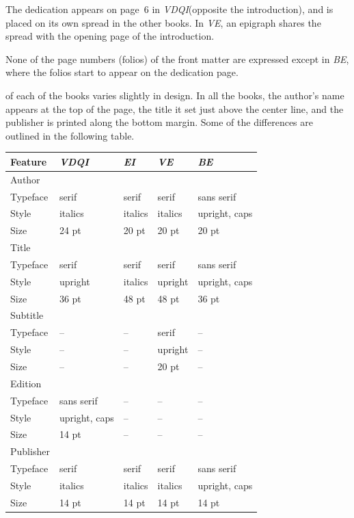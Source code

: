 \documentclass[nohyper,nobib]{thiel-book}
\newcommand{\vdqi}{\textit{VDQI}\xspace}
\newcommand{\ei}{\textit{EI}\xspace}
\newcommand{\ve}{\textit{VE}\xspace}
\newcommand{\be}{\textit{BE}\xspace}
\newcommand{\na}{\quad--}%
\begin{document}
The dedication appears on page~6 in \vdqi (opposite the introduction), and
is placed on its own spread in the other books.  In \ve, an epigraph shares
the spread with the opening page of the introduction.

None of the page numbers (folios) of the front matter are expressed except in
\be, where the folios start to appear on the dedication page.

 of each of the books varies slightly in
design.  In all the books, the author's name appears at the top of the
page, the title it set just above the center line, and the publisher is
printed along the bottom margin.  Some of the differences are outlined in
the following table.

\bigskip
\begin{center}
\footnotesize
\begin{tabular}{lllll}
\toprule
Feature & \vdqi & \ei & \ve & \be \\
\midrule
Author & & & & \\
\quad Typeface & serif   & serif   & serif   & sans serif \\
\quad Style    & italics & italics & italics & upright, caps \\
\quad Size     & 24 pt   & 20 pt   & 20 pt   & 20 pt \\
\addlinespace
Title & & & & \\
\quad Typeface & serif   & serif   & serif   & sans serif \\
\quad Style    & upright & italics & upright & upright, caps \\
\quad Size     & 36 pt   & 48 pt   & 48 pt   & 36 pt \\
\addlinespace
Subtitle & & & & \\
\quad Typeface & \na     & \na     & serif   & \na \\
\quad Style    & \na     & \na     & upright & \na \\
\quad Size     & \na     & \na     & 20 pt   & \na \\
\addlinespace
Edition & & & & \\
\quad Typeface & sans serif    & \na  & \na  & \na \\
\quad Style    & upright, caps & \na  & \na  & \na \\
\quad Size     & 14 pt         & \na  & \na  & \na \\
\addlinespace
Publisher & & & & \\
\quad Typeface & serif   & serif   & serif   & sans serif \\
\quad Style    & italics & italics & italics & upright, caps \\
\quad Size     & 14 pt   & 14 pt   & 14 pt   & 14 pt \\
\bottomrule
\end{tabular}
\end{center}
\end{document}
